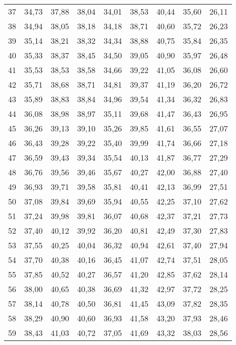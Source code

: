 \begin{longtable}{c c c c c c c c c}
      37	& 34,73	& 37,88	& 38,04	& 34,01	& 38,53	& 40,44	& 35,60	& 26,11 \\
      38	& 34,94	& 38,05	& 38,18	& 34,18	& 38,71	& 40,60	& 35,72	& 26,23 \\
      39	& 35,14	& 38,21	& 38,32	& 34,34	& 38,88	& 40,75	& 35,84	& 26,35 \\
      40	& 35,33	& 38,37	& 38,45	& 34,50	& 39,05	& 40,90	& 35,97	& 26,48 \\
      41	& 35,53	& 38,53	& 38,58	& 34,66	& 39,22	& 41,05	& 36,08	& 26,60 \\
      42	& 35,71	& 38,68	& 38,71	& 34,81	& 39,37	& 41,19	& 36,20	& 26,72 \\
      43	& 35,89	& 38,83	& 38,84	& 34,96	& 39,54	& 41,34	& 36,32	& 26,83 \\
      44	& 36,08	& 38,98	& 38,97	& 35,11	& 39,68	& 41,47	& 36,43	& 26,95 \\
      45	& 36,26	& 39,13	& 39,10	& 35,26	& 39,85	& 41,61	& 36,55	& 27,07 \\
      46	& 36,43	& 39,28	& 39,22	& 35,40	& 39,99	& 41,74	& 36,66	& 27,18 \\
      47	& 36,59	& 39,43	& 39,34	& 35,54	& 40,13	& 41,87	& 36,77	& 27,29 \\
      48	& 36,76	& 39,56	& 39,46	& 35,67	& 40,27	& 42,00	& 36,88	& 27,40 \\
      49	& 36,93	& 39,71	& 39,58	& 35,81	& 40,41	& 42,13	& 36,99	& 27,51 \\
      50	& 37,08	& 39,84	& 39,69	& 35,94	& 40,55	& 42,25	& 37,10	& 27,62 \\
      51	& 37,24	& 39,98	& 39,81	& 36,07	& 40,68	& 42,37	& 37,21	& 27,73 \\
      52	& 37,40	& 40,12	& 39,92	& 36,20	& 40,81	& 42,49	& 37,30	& 27,83 \\
      53	& 37,55	& 40,25	& 40,04	& 36,32	& 40,94	& 42,61	& 37,40	& 27,94 \\
      54	& 37,70	& 40,38	& 40,16	& 36,45	& 41,07	& 42,74	& 37,51	& 28,05 \\
      55	& 37,85	& 40,52	& 40,27	& 36,57	& 41,20	& 42,85	& 37,62	& 28,14 \\
      56	& 38,00	& 40,65	& 40,38	& 36,69	& 41,32	& 42,97	& 37,72	& 28,25 \\
      57	& 38,14	& 40,78	& 40,50	& 36,81	& 41,45	& 43,09	& 37,82	& 28,35 \\
      58	& 38,29	& 40,90	& 40,60	& 36,93	& 41,58	& 43,20	& 37,93	& 28,46 \\
      59	& 38,43	& 41,03	& 40,72	& 37,05	& 41,69	& 43,32	& 38,03	& 28,56 \\

\end{longtable}
